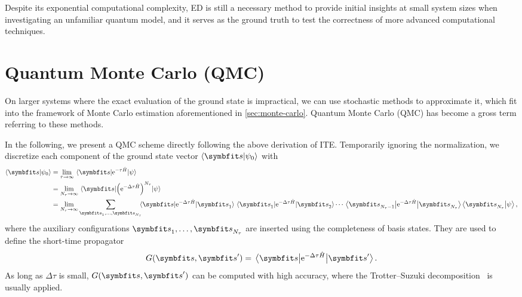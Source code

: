 Despite its exponential computational complexity, ED is still a necessary method to provide initial insights at small system sizes when investigating an unfamiliar quantum model, and it serves as the ground truth to test the correctness of more advanced computational techniques.

\section{Quantum Monte Carlo (QMC)}
\label{sec:qmc}

On larger systems where the exact evaluation of the ground state is impractical, we can use stochastic methods to approximate it, which fit into the framework of Monte Carlo estimation aforementioned in \cref{sec:monte-carlo}. Quantum Monte Carlo (QMC) has become a gross term referring to these methods.

In the following, we present a QMC scheme directly following the above derivation of ITE. Temporarily ignoring the normalization, we discretize each component of the ground state vector $\ip{\vs}{\psi_0}$ with
\begin{align}
\ip{\vs}{\psi_0} &= \lim_{\tau \to \infty} \mel{\vs}{\rme^{-\tau \hat{H}}}{\psiinit} \\
&= \lim_{N_\tau \to \infty} \mel{\vs}{\edthp^{N_\tau}}{\psiinit} \\
&= \lim_{N_\tau \to \infty} \sum_{\vs_1, \ldots, \vs_{N_\tau}}\!\!\!\!\mel{\vs}{\edth}{\vs_1} \mel{\vs_1}{\edth}{\vs_2} \cdots \mel{\vs_{N_\tau - 1}}{\edth}{\vs_{N_\tau}} \ip{\vs_{N_\tau}}{\psiinit},
\end{align}
where the auxiliary configurations $\vs_1, \ldots, \vs_{N_\tau}$ are inserted using the completeness of basis states. They are used to define the short-time propagator
\begin{equation}
G(\vs, \vs') = \mel{\vs}{\edth}{\vs'}.
\end{equation}
As long as $\Delta \tau$ is small, $G(\vs, \vs')$ can be computed with high accuracy, where the Trotter--Suzuki decomposition~\cite{suzuki1976generalized} is usually applied.

